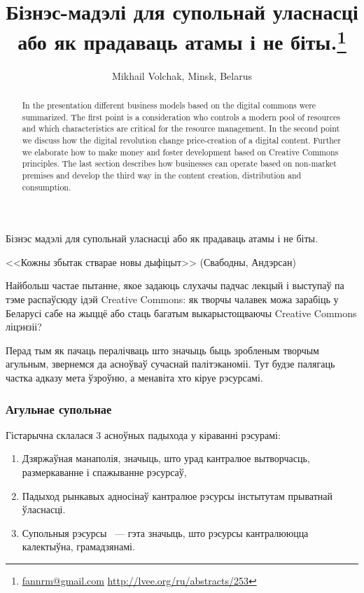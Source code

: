 \documentclass[10pt, a5paper]{article}
\begin{document}
\title{Бізнэс-мадэлі для супольнай уласнасці або як прадаваць атамы і не біты.\footnote{\url{fannrm@gmail.com} \url{http://lvee.org/ru/abstracts/253}}}
\author{Mikhail Volchak, Minsk, Belarus}
\maketitle
\begin{abstract}
In the presentation different business models based on the digital commons were summarized. The first point is a consideration who controls a modern pool of resources and which characteristics are critical for the resource management. In the second point we discuss how the digital revolution change price-creation of a digital content. Further we elaborate how to make money and foster development based on Creative Commons principles. The last section describes how businesses can operate based on non-market premises and develop the third way in the content creation, distribution and consumption.
\end{abstract}
Бізнэс мадэлі для супольнай уласнасці або як прадаваць атамы і не біты.

<<Кожны збытак стварае новы дыфіцыт>> 
(Свабодны, Андэрсан)

Найбольш частае пытанне, якое задаюць слухачы падчас лекцый і выступаў па тэме распаўсюду ідэй Creative Commons: як творчы чалавек можа зарабіць у Беларусі сабе на жыццё або стаць багатым выкарыстощваючы Creative Commons ліцэнзіі?

Перад тым як пачаць пералічваць што значыць быць зробленым творчым агульным, звернемся да асноўваў сучаснай палітэканоміі. Тут будзе палягаць частка адказу мета ўзроўню, а менавіта хто кіруе рэсурсамі.

\subsubsection*{Агульнае супольнае}

Гістарычна склалася 3 асноўных падыхода у кіраванні рэсурамі:

\begin{enumerate}
  \item Дзяржаўная манаполія, значыць, што урад кантралюе вытворчасць, размеркаванне і спажыванне рэсурсаў,
  \item Падыход рынкавых адносінаў кантралюе рэсурсы інстытутам прыватнай ўласнасці.
  \item Супольныя рэсурсы ~--- гэта значыць, што рэсурсы кантралююцца калектыўна, грамадзянамі.
\end{enumerate}
\end{document}
